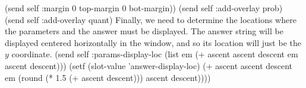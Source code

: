        (send self :margin 0 top-margin 0 bot-margin))
    (send self :add-overlay prob)
    (send self :add-overlay quant)
\nwendcode{}\nwdocspar
Finally, we need to determine the locations where the parameters and
the answer must be displayed. The answer string will be displayed
centered horizontally in the window, and so its location will just be
the $y$ coordinate.
\nwenddocs{}\plusendmoddef
    (send self :params-display-loc 
          (list em (+ ascent ascent descent em ascent descent)))
    (setf (slot-value 'answer-display-loc) 
          (+ ascent ascent descent em 
             (round (* 1.5 (+ ascent descent)))
             ascent descent))))
\eatline
{}\nwendcode{}\nwdocspar

